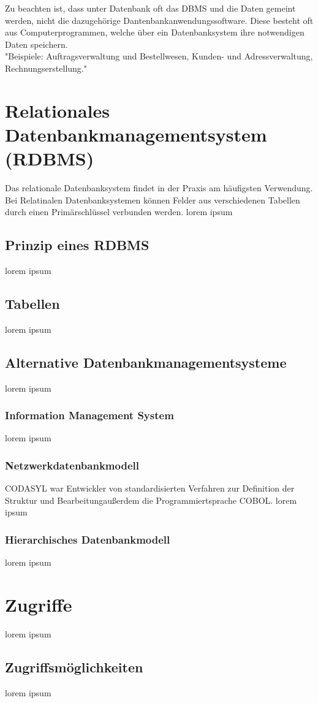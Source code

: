 \documentclass[12pt,a4paper]{report}
\begin{document}
Zu beachten ist, dass unter Datenbank oft das DBMS und die Daten gemeint werden, nicht die dazugehörige Dantenbankanwendungssoftware. Diese besteht oft aus Computerprogrammen, welche über ein Datenbanksystem ihre notwendigen Daten speichern.
\\"Beispiele: Auftragsverwaltung und Bestellwesen, Kunden- und Adressverwaltung, Rechnungserstellung."

\section{Relationales Datenbankmanagementsystem (RDBMS)}
Das relationale Datenbanksystem findet in der Praxis am häufigsten Verwendung.
Bei Relatinalen Datenbanksystemen können Felder aus verschiedenen Tabellen durch einen Primärschlüssel verbunden werden.
lorem ipsum
\subsection{Prinzip eines RDBMS}
lorem ipsum
\subsection{Tabellen}
lorem ipsum
\subsection{Alternative Datenbankmanagementsysteme}
lorem ipsum
\subsubsection{Information Management System}
lorem ipsum
\subsubsection{Netzwerkdatenbankmodell}
CODASYL war Entwickler von standardisierten Verfahren zur Definition der Struktur und Bearbeitungaußerdem die Programmiertsprache COBOL. 
lorem ipsum
\subsubsection{Hierarchisches Datenbankmodell}
lorem ipsum
\section{Zugriffe}
lorem ipsum
\subsection{Zugriffsmöglichkeiten}
lorem ipsum
\end{document}

